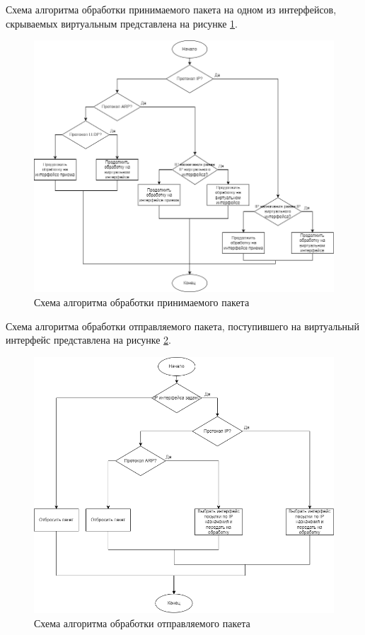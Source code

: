 \documentclass[14pt, a4paper]{extarticle}
\begin{document}
Схема алгоритма обработки принимаемого пакета на одном из интерфейсов, скрываемых виртуальным представлена на рисунке \ref{in}.
\begin{figure}[H]
	\centering
	\includegraphics[scale=0.5]{in.png}
	\caption{Схема алгоритма обработки принимаемого пакета}
	\label{in}
\end{figure}

Схема алгоритма обработки отправляемого пакета, поступившего на виртуальный интерфейс представлена на рисунке \ref{out}.
\begin{figure}[H]
	\centering
	\includegraphics[scale=0.6]{out.png}
	\caption{Схема алгоритма обработки отправляемого пакета}
	\label{out}
\end{figure}
\end{document}
